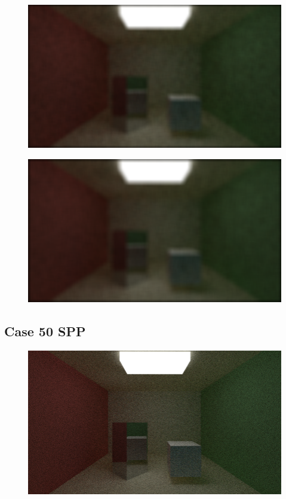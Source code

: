 \documentclass[titlepage,12pt]{report}
\begin{document}
\begin{appendices}
\begin{figure}[H]
	\centering
  	\includegraphics[scale=0.5]{media/mean/cornell_normal_10_mean_filter_17.png}
  	\label{ap3}
\end{figure}

\begin{figure}[H]
	\centering
  	\includegraphics[scale=0.5]{media/mean/cornell_normal_10_mean_filter_21.png}
  	\label{ap4}
\end{figure}

\subsection{Case 50 SPP}

\begin{figure}[H]
	\centering
  	\includegraphics[scale=0.5]{media/cornell_normal_50.png}
  	\label{ap5}
\end{figure}


\end{appendices}
\end{document}
